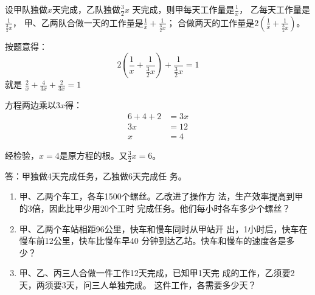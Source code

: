 \begin{solution}
    设甲队独做$x$天完成，乙队独做$\frac{3}{2}x$
天完成，则甲每天工作量是$\frac{1}{x}$，
乙每天工作量是$\frac{1}{\tfrac{3}{2}x}$，
甲、乙两队合做一天的工作量是$\frac{1}{x}+\frac{1}{\tfrac{3}{2}x}$；
合做两天的工作量是$2\left(\frac{1}{x}+\frac{1}{\tfrac{3}{2}x}\right)$。

按题意得：
\[2\left(\frac{1}{x}+\frac{1}{\tfrac{3}{2}x}\right)+\frac{1}{\tfrac{3}{2}x}=1\]
就是 $\frac{2}{x}+\frac{4}{3x}+\frac{2}{3x}=1$

方程两边乘以$3x$得：
\[\begin{split}
   6+4+2&=3x\\
3x&=12\\
x&=4 
\end{split}\]

经检验，$x=4$是原方程的根。又$\frac{3}{2}x=6$。

答：甲独做4天完成任务，乙独做6天完成任
务。
\end{solution}

\begin{ex}
\begin{enumerate}
    \item 甲、乙两个车工，各车1500个螺丝。乙改进了操作方
    法，生产效率提高到甲的3倍，因此比甲少用20个工时
    完成任务。他们每小时各车多少个螺丝？
    \item 甲、乙两个车站相距96公里，快车和慢车同时从甲站开
    出，1小时后，快车在慢车前12公里，快车比慢车早40
    分钟到达乙站。快车和慢车的速度各是多少？
    \item 甲、乙、丙三人合做一件工作12天完成，已知甲1天完
    成的工作，乙须要2天，两须要3天，问三人单独完成。
    这件工作，各需要多少天？
\end{enumerate}    
\end{ex}

